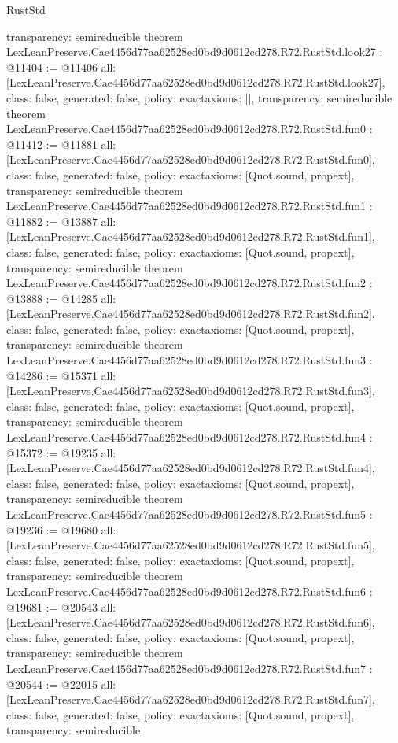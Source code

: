 \begin{lexlean}{RustStd}
\begin{coremodule}
{  transparency: semireducible
}
theorem LexLeanPreserve.Cae4456d77aa62528ed0bd9d0612cd278.R72.RustStd.look27 : @11404 := @11406 {
  all: [LexLeanPreserve.Cae4456d77aa62528ed0bd9d0612cd278.R72.RustStd.look27],
  class: false,
  generated: false,
  policy: exact{axioms: []},
  transparency: semireducible
}
theorem LexLeanPreserve.Cae4456d77aa62528ed0bd9d0612cd278.R72.RustStd.fun0 : @11412 := @11881 {
  all: [LexLeanPreserve.Cae4456d77aa62528ed0bd9d0612cd278.R72.RustStd.fun0],
  class: false,
  generated: false,
  policy: exact{axioms: [Quot.sound, propext]},
  transparency: semireducible
}
theorem LexLeanPreserve.Cae4456d77aa62528ed0bd9d0612cd278.R72.RustStd.fun1 : @11882 := @13887 {
  all: [LexLeanPreserve.Cae4456d77aa62528ed0bd9d0612cd278.R72.RustStd.fun1],
  class: false,
  generated: false,
  policy: exact{axioms: [Quot.sound, propext]},
  transparency: semireducible
}
theorem LexLeanPreserve.Cae4456d77aa62528ed0bd9d0612cd278.R72.RustStd.fun2 : @13888 := @14285 {
  all: [LexLeanPreserve.Cae4456d77aa62528ed0bd9d0612cd278.R72.RustStd.fun2],
  class: false,
  generated: false,
  policy: exact{axioms: [Quot.sound, propext]},
  transparency: semireducible
}
theorem LexLeanPreserve.Cae4456d77aa62528ed0bd9d0612cd278.R72.RustStd.fun3 : @14286 := @15371 {
  all: [LexLeanPreserve.Cae4456d77aa62528ed0bd9d0612cd278.R72.RustStd.fun3],
  class: false,
  generated: false,
  policy: exact{axioms: [Quot.sound, propext]},
  transparency: semireducible
}
theorem LexLeanPreserve.Cae4456d77aa62528ed0bd9d0612cd278.R72.RustStd.fun4 : @15372 := @19235 {
  all: [LexLeanPreserve.Cae4456d77aa62528ed0bd9d0612cd278.R72.RustStd.fun4],
  class: false,
  generated: false,
  policy: exact{axioms: [Quot.sound, propext]},
  transparency: semireducible
}
theorem LexLeanPreserve.Cae4456d77aa62528ed0bd9d0612cd278.R72.RustStd.fun5 : @19236 := @19680 {
  all: [LexLeanPreserve.Cae4456d77aa62528ed0bd9d0612cd278.R72.RustStd.fun5],
  class: false,
  generated: false,
  policy: exact{axioms: [Quot.sound, propext]},
  transparency: semireducible
}
theorem LexLeanPreserve.Cae4456d77aa62528ed0bd9d0612cd278.R72.RustStd.fun6 : @19681 := @20543 {
  all: [LexLeanPreserve.Cae4456d77aa62528ed0bd9d0612cd278.R72.RustStd.fun6],
  class: false,
  generated: false,
  policy: exact{axioms: [Quot.sound, propext]},
  transparency: semireducible
}
theorem LexLeanPreserve.Cae4456d77aa62528ed0bd9d0612cd278.R72.RustStd.fun7 : @20544 := @22015 {
  all: [LexLeanPreserve.Cae4456d77aa62528ed0bd9d0612cd278.R72.RustStd.fun7],
  class: false,
  generated: false,
  policy: exact{axioms: [Quot.sound, propext]},
  transparency: semireducible
}
\end{coremodule}
\end{lexlean}
